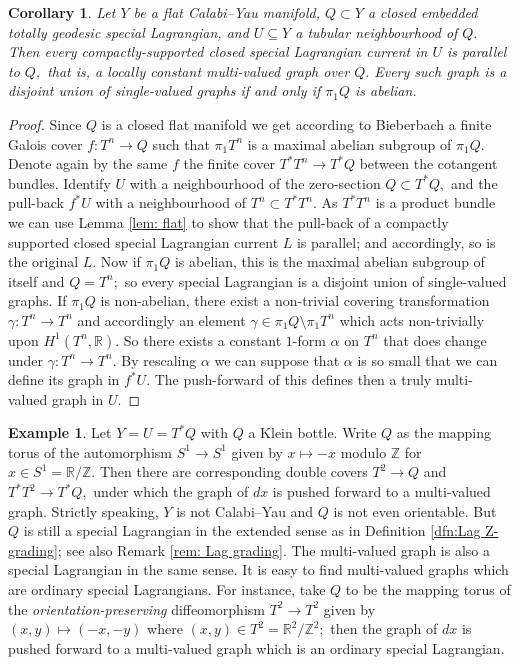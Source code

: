 \documentclass{article}
\theoremstyle{plain}%
\newtheorem{cor}[thm]{Corollary}
\theoremstyle{definition}
\newtheorem{exam}[thm]{Example}
\numberwithin{equation}{section}
\numberwithin{figure}{section}
\def\l{\label}
\def\R{{\mathbin{\mathbb R}}}
\def\Z{{\mathbin{\mathbb Z}}}
\def\al{\alpha}
\def\ga{\gamma}
\def\-{\setminus}
\def\sb{\subseteq}
\begin{document}
\begin{cor}\l{flat}
Let $Y$ be a flat Calabi--Yau manifold, $Q\subset Y$ a closed embedded totally geodesic special Lagrangian, and $U\sb Y$ a tubular neighbourhood of $Q.$
Then every compactly-supported closed special Lagrangian current in $U$ is parallel to $Q,$ that is, a locally constant multi-valued graph over $Q.$ Every such graph is a disjoint union of single-valued graphs if and only if $\pi_1Q$ is abelian.
\end{cor}
\begin{proof}
Since $Q$ is a closed flat manifold we get according to Bieberbach a finite Galois cover $f:T^n\to Q$
such that $\pi_1T^n$ is a maximal abelian subgroup of $\pi_1Q.$
Denote again by the same $f$ the finite cover $T^*T^n\to T^*Q$ between the cotangent bundles.
Identify $U$ with a neighbourhood of the zero-section $Q\subset T^*Q,$ and the pull-back $f^*U$ with a neighbourhood of $T^n\subset T^*T^n.$
As $T^*T^n$ is a product bundle we can use Lemma \ref{lem: flat} to show that the pull-back of a compactly supported closed special Lagrangian current $L$ is parallel; and accordingly, so is the original $L.$
Now if $\pi_1Q$ is abelian, this is the maximal abelian subgroup of itself and $Q=T^n;$ so every special Lagrangian is a disjoint union of single-valued graphs.
If $\pi_1Q$ is non-abelian, there exist a non-trivial covering transformation $\ga:T^n\to T^n$ and accordingly an element $\ga\in\pi_1Q\-\pi_1T^n$ which acts non-trivially upon $H^1(T^n,\R).$ So there exists a constant $1$-form $\al$ on $T^n$ that does change under $\ga:T^n\to T^n.$
By rescaling $\al$ we can suppose that $\al$ is so small that we can define its graph in $f^*U.$ The 
 push-forward of this defines then a truly multi-valued graph in $U.$
\end{proof}

\begin{exam}
Let $Y=U=T^*Q$ with $Q$ a Klein bottle. Write $Q$ as the mapping torus of 
the automorphism $S^1\to S^1$ given by $x\mapsto-x$ modulo $\Z$ for $x\in S^1=\R/\Z.$
Then there are corresponding double covers $T^2\to Q$ and $T^*T^2\to T^*Q,$ under which the graph of $dx$ is pushed forward to a multi-valued graph. Strictly speaking, $Y$ is not Calabi--Yau and $Q$ is not even orientable.
But $Q$ is still a special Lagrangian in the extended sense as in Definition \ref{dfn:Lag Z-grading}; see also Remark \ref{rem: Lag grading}. The multi-valued graph is also a special Lagrangian in the same sense. 
It is easy to find multi-valued graphs which are ordinary special Lagrangians. For instance, take $Q$ to be the mapping torus of the {\it orientation-preserving} diffeomorphism
$T^2\to T^2$ given by $(x,y)\mapsto(-x,-y)$ where $(x,y)\in T^2=\R^2/\Z^2;$ then the graph of $dx$ is pushed forward to a multi-valued graph which is an ordinary special Lagrangian.
\end{exam}
\end{document}
